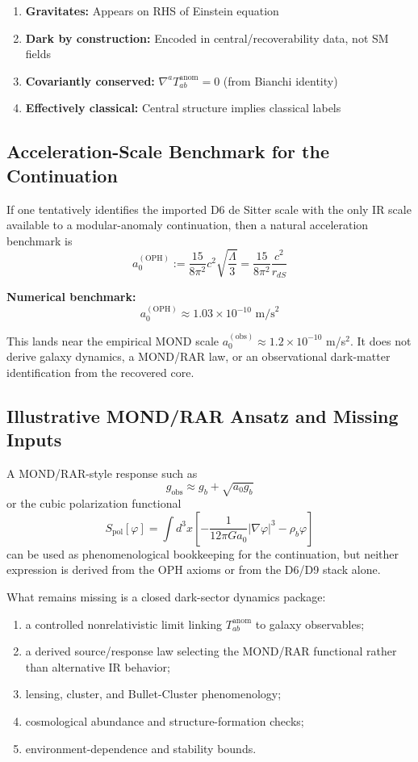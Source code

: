 \begin{enumerate}
\def\labelenumi{\arabic{enumi}.}
\tightlist
\item
 \textbf{Gravitates:} Appears on RHS of Einstein equation
\item
 \textbf{Dark by construction:} Encoded in central/recoverability data, not SM fields
\item
 \textbf{Covariantly conserved:} \(\nabla^a T_{ab}^{\text{anom}} = 0\) (from Bianchi identity)
\item
 \textbf{Effectively classical:} Central structure implies classical labels
\end{enumerate}

\subsection{Acceleration-Scale Benchmark for the Continuation}\label{94-the-mond-acceleration-scale}

If one tentatively identifies the imported D6 de Sitter scale with the only IR scale available to a modular-anomaly continuation, then a natural acceleration benchmark is \[a_0^{(\text{OPH})} := \frac{15}{8\pi^2} c^2 \sqrt{\frac{\Lambda}{3}} = \frac{15}{8\pi^2} \frac{c^2}{r_{dS}}\]

\textbf{Numerical benchmark:} \[a_0^{(\text{OPH})} \approx 1.03 \times 10^{-10} \text{ m/s}^2\]

This lands near the empirical MOND scale \(a_0^{(\text{obs})} \approx 1.2 \times 10^{-10}\) m/s\(^2\). It does not derive galaxy dynamics, a MOND/RAR law, or an observational dark-matter identification from the recovered core.

\subsection{Illustrative MOND/RAR Ansatz and Missing Inputs}\label{95-polarization-response-mond-like-scaling}

A MOND/RAR-style response such as \[g_{\text{obs}} \approx g_b + \sqrt{a_0 g_b}\]
or the cubic polarization functional \[S_{\text{pol}}[\varphi] = \int d^3x \left[-\frac{1}{12\pi G a_0}|\nabla\varphi|^3 - \rho_b \varphi\right]\]
can be used as phenomenological bookkeeping for the continuation, but neither expression is derived from the OPH axioms or from the D6/D9 stack alone.

What remains missing is a closed dark-sector dynamics package:
\begin{enumerate}
\item a controlled nonrelativistic limit linking \(T_{ab}^{\text{anom}}\) to galaxy observables;
\item a derived source/response law selecting the MOND/RAR functional rather than alternative IR behavior;
\item lensing, cluster, and Bullet-Cluster phenomenology;
\item cosmological abundance and structure-formation checks;
\item environment-dependence and stability bounds.
\end{enumerate}

